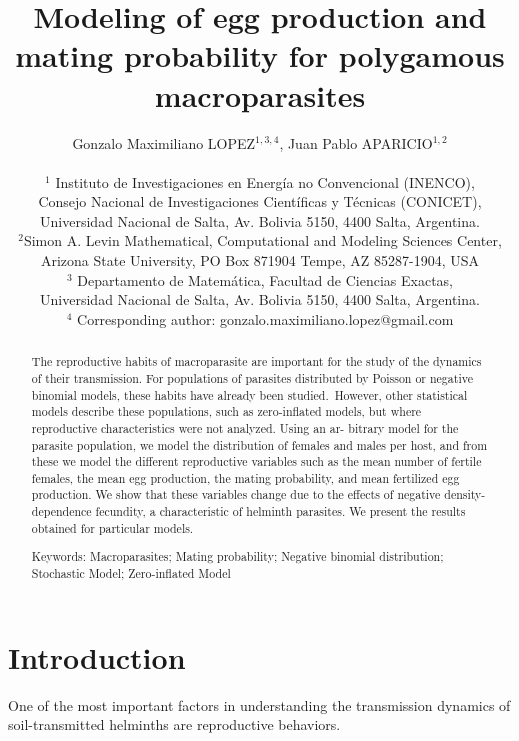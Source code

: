 \documentclass[12pt,a4paper]{article}
\title{Modeling of egg production and mating probability for polygamous macroparasites}
\author{Gonzalo Maximiliano LOPEZ$^{1,3,4}$, Juan Pablo APARICIO$^{1,2}$\\
	\\
	{\small $^1$ Instituto de Investigaciones en Energ\'ia no Convencional (INENCO),} \\ {\small Consejo Nacional de Investigaciones Cient\'ificas y T\'ecnicas (CONICET),}\\
	{\small Universidad Nacional de Salta, Av. Bolivia 5150, 4400 Salta, Argentina.}\\
	$^2${\small Simon A. Levin Mathematical, Computational and Modeling Sciences Center,} \\ {\small Arizona State University, PO Box 871904 Tempe, AZ 85287-1904, USA}\\
	{\small $^3$ Departamento de Matem\'atica, Facultad de Ciencias Exactas,}\\{\small Universidad Nacional de Salta, Av. Bolivia 5150, 4400 Salta, Argentina.}\\
	{\small $^4$ Corresponding author: gonzalo.maximiliano.lopez@gmail.com}}
\date{}
\theoremstyle{plain}%
\theoremstyle{definition}
\theoremstyle{remark}
\begin{document}
\maketitle

\begin{abstract}

The reproductive habits of macroparasite are important for the study of the dynamics of their transmission. For populations of parasites distributed by Poisson or negative binomial models, these habits have already been studied. However, other statistical models describe these populations, such as zero-inflated models, but where reproductive characteristics were not analyzed. Using an ar- bitrary model for the parasite population, we model the distribution of females and males per host, and from these we model the different reproductive variables such as the mean number of fertile females, the mean egg production, the mating probability, and mean fertilized egg production. We show that these variables change due to the effects of negative density-dependence fecundity, a characteristic of helminth parasites. We present the results obtained for particular models.

	
	Keywords: Macroparasites; Mating probability; Negative binomial distribution; Stochastic Model; Zero-inflated Model
\end{abstract}

\tableofcontents
	\section{Introduction}
	One of the most important factors in understanding the transmission dynamics of soil-transmitted helminths are reproductive behaviors.
	
\end{document}
